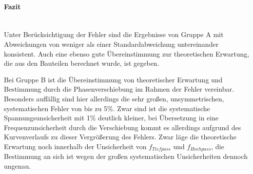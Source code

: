 \documentclass[12pt,a4paper]{article}
\begin{document}
\paragraph{Fazit} \mbox{}\\
Unter Berücksichtigung der Fehler sind die Ergebnisse von Gruppe A mit Abweichungen von weniger als einer Standardabweichung untereinander konsistent. Auch eine ebenso gute Übereinstimmung zur theoretischen Erwartung, die aus den Bauteilen berechnet wurde, ist gegeben.

Bei Gruppe B ist die Übereinstimmung von theoretischer Erwartung und Bestimmung durch die Phasenverschiebung im Rahmen der Fehler vereinbar. Besonders auffällig sind hier allerdings die sehr großen, unsymmetrischen, systematischen Fehler von bis zu 5\%. Zwar sind ist die systematische Spannungsunsicherheit mit 1\% deutlich kleiner, bei Übersetzung in eine Frequenzunsicherheit durch die Verschiebung kommt es allerdings aufgrund des Kurvenverlaufs zu dieser Vergrößerung des Fehlers. Zwar läge die theoretische Erwartung noch innerhalb der Unsicherheit von $f_{Tiefpass}$ und $f_{Hochpass}$, die Bestimmung an sich ist wegen der großen systematischen Unsicherheiten dennoch ungenau.
\end{document}
